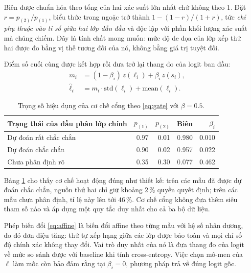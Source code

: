 \documentclass[11pt,a4paper]{article}
\begin{document}
Biên được chuẩn hóa theo tổng của hai xác suất lớn nhất chứ không theo $1$. Đặt
$r = p_{(2)}/p_{(1)}$, biểu thức trong ngoặc trở thành $1 - (1-r)/(1+r)$, tức
\emph{chỉ phụ thuộc vào tỉ số giữa hai lớp dẫn đầu} và độc lập với phần khối
lượng xác suất mà chúng chiếm. Đây là tính chất mong muốn: mức độ đe dọa của lớp
xếp thứ hai được đo bằng vị thế tương đối của nó, không bằng giá trị tuyệt đối.

Điểm số cuối cùng được kết hợp rồi đưa trở lại thang đo của logit ban đầu:
\begin{align}
m_i &= (1 - \beta_i)\, z(\ell_i) + \beta_i\, z(s_i),\\
\hat{\ell}_i &= m_i \cdot \mathrm{std}(\ell_i) + \mathrm{mean}(\ell_i).
\label{eq:affine}
\end{align}

\begin{table}[htbp]
\centering
\caption{Trọng số hiệu dụng của cơ chế cổng theo \eqref{eq:gate} với
$\beta = 0.5$.}
\label{tab:gate-example}
\begin{tabular}{@{}lrrrr@{}}
\toprule
Trạng thái của đầu phân lớp chính & $p_{(1)}$ & $p_{(2)}$ & Biên & $\beta_i$ \\
\midrule
Dự đoán rất chắc chắn   & 0.97 & 0.01 & 0.980 & 0.010 \\
Dự đoán chắc chắn       & 0.90 & 0.02 & 0.957 & 0.022 \\
Chưa phân định rõ       & 0.35 & 0.30 & 0.077 & 0.462 \\
\bottomrule
\end{tabular}
\end{table}

Bảng \ref{tab:gate-example} cho thấy cơ chế hoạt động đúng như thiết kế: trên các
mẫu đã được dự đoán chắc chắn, nguồn thứ hai chỉ giữ khoảng $2\,\%$ quyền quyết
định; trên các mẫu chưa phân định, tỉ lệ này lên tới $46\,\%$. Cơ chế cổng không
đưa thêm siêu tham số nào và áp dụng một quy tắc duy nhất cho cả ba bộ dữ liệu.

Phép biến đổi \eqref{eq:affine} là biến đổi affine theo từng mẫu với hệ số nhân
dương, do đó đơn điệu tăng: thứ tự xếp hạng giữa các lớp được bảo toàn và mọi
chỉ số độ chính xác không thay đổi. Vai trò duy nhất của nó là đưa thang đo của
logit về mức so sánh được với baseline khi tính cross-entropy. Việc chọn mô-men
của $\ell$ làm mốc còn bảo đảm rằng tại $\beta_i = 0$, phương pháp trả về đúng
logit gốc.
\end{document}
